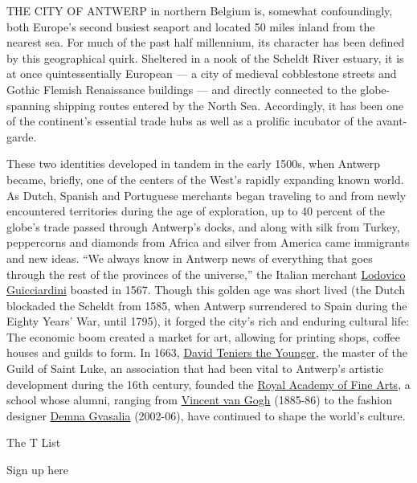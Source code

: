 THE CITY OF ANTWERP in northern Belgium is, somewhat confoundingly, both
Europe's second busiest seaport and located 50 miles inland from the
nearest sea. For much of the past half millennium, its character has
been defined by this geographical quirk. Sheltered in a nook of the
Scheldt River estuary, it is at once quintessentially European --- a
city of medieval cobblestone streets and Gothic Flemish Renaissance
buildings --- and directly connected to the globe-spanning shipping
routes entered by the North Sea. Accordingly, it has been one of the
continent's essential trade hubs as well as a prolific incubator of the
avant-garde.

These two identities developed in tandem in the early 1500s, when
Antwerp became, briefly, one of the centers of the West's rapidly
expanding known world. As Dutch, Spanish and Portuguese merchants began
traveling to and from newly encountered territories during the age of
exploration, up to 40 percent of the globe's trade passed through
Antwerp's docks, and along with silk from Turkey, peppercorns and
diamonds from Africa and silver from America came immigrants and new
ideas. ``We always know in Antwerp news of everything that goes through
the rest of the provinces of the universe,'' the Italian merchant
\href{https://www.oxfordartonline.com/groveart/view/10.1093/gao/9781884446054.001.0001/oao-9781884446054-e-7000035507}{Lodovico
Guicciardini} boasted in 1567. Though this golden age was short lived
(the Dutch blockaded the Scheldt from 1585, when Antwerp surrendered to
Spain during the Eighty Years' War, until 1795), it forged the city's
rich and enduring cultural life: The economic boom created a market for
art, allowing for printing shops, coffee houses and guilds to form. In
1663,
\href{https://www.nationalgallery.org.uk/artists/david-teniers-the-younger}{David
Teniers the Younger}, the master of the Guild of Saint Luke, an
association that had been vital to Antwerp's artistic development during
the 16th century, founded the
\href{https://www.ap.be/en/royal-academy-fine-arts-antwerp}{Royal
Academy of Fine Arts}, a school whose alumni, ranging from
\href{https://www.nytimes.com/topic/person/vincent-van-gogh}{Vincent van
Gogh} (1885-86) to the fashion designer
\href{https://www.nytimes.com/2016/04/11/t-magazine/gucci-alessandro-michele-balenciaga-vetements-demna-gvasalia.html}{Demna
Gvasalia} (2002-06), have continued to shape the world's culture.

The T List \textbar{}

Sign up here

